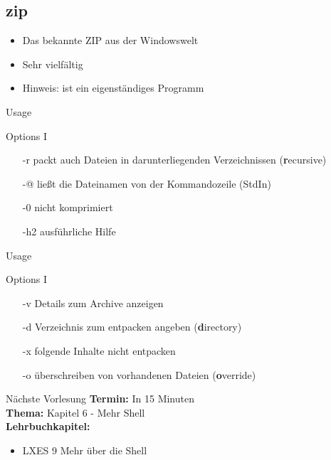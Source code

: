 \documentclass[aspectratio=43]{beamer}
\begin{document}
\subsection{zip}
\begin{frame} 
	\begin{block}{} 
	\begin{itemize}
	\item Das bekannte ZIP aus der Windowswelt
	\item Sehr vielfältig
	\item Hinweis:  ist ein eigenständiges Programm
	\end{itemize}
	\end{block}
\end{frame}

\begin{frame} 
	\begin{exampleblock}{Usage}
	\end{exampleblock}

	\begin{exampleblock}{Options I}
	\begin{itemize}
	\item[-r] packt auch Dateien in darunterliegenden Verzeichnissen (\textbf{r}ecursive)
	\item[-@] ließt die Dateinamen von der Kommandozeile (StdIn)
	\item[-0] nicht komprimiert
	\item[-h2] ausführliche Hilfe
	\end{itemize}
	\end{exampleblock}
\end{frame}

\begin{frame} 
	\begin{exampleblock}{Usage}
	\end{exampleblock}

	\begin{exampleblock}{Options I}
	\begin{itemize}
	\item[-v] Details zum Archive anzeigen
	\item[-d] Verzeichnis zum entpacken angeben (\textbf{d}irectory)
	\item[-x] folgende Inhalte nicht entpacken
	\item[-o] überschreiben von vorhandenen Dateien (\textbf{o}verride)
	\end{itemize}
	\end{exampleblock}
\end{frame}



\begin{frame}[plain]
\begin{alertblock}{Nächste Vorlesung}
\textbf{Termin:} In 15 Minuten\\
\textbf{Thema:} Kapitel 6 - Mehr Shell \\
\textbf{Lehrbuchkapitel:} 
\begin{itemize}
\item LXES 9 Mehr über die Shell
\end{itemize}
\end{alertblock}
\end{frame}

\materialframe
\end{document}
